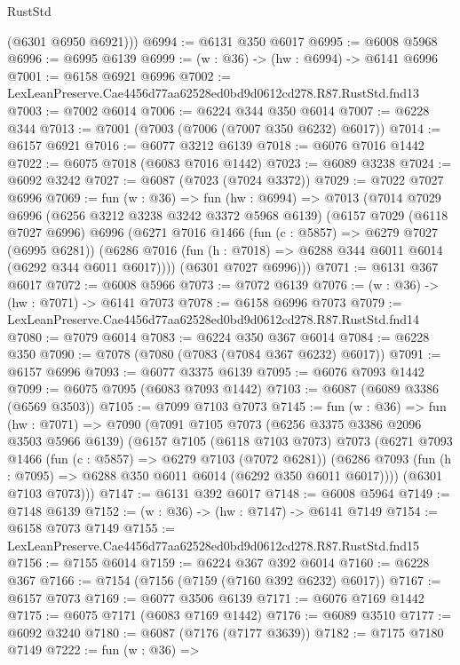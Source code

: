 \begin{lexlean}{RustStd}
\begin{coremodule}
{{        (@6301 @6950 @6921)))
@6994 := @6131 @350 @6017
@6995 := @6008 @5968
@6996 := @6995 @6139
@6999 := (w : @36) -> (hw : @6994) -> @6141 @6996
@7001 := @6158 @6921 @6996
@7002 := LexLeanPreserve.Cae4456d77aa62528ed0bd9d0612cd278.R87.RustStd.fnd13
@7003 := @7002 @6014
@7006 := @6224 @344 @350 @6014
@7007 := @6228 @344
@7013 := @7001 (@7003 (@7006 (@7007 @350 @6232) @6017))
@7014 := @6157 @6921
@7016 := @6077 @3212 @6139
@7018 := @6076 @7016 @1442
@7022 := @6075 @7018 (@6083 @7016 @1442)
@7023 := @6089 @3238
@7024 := @6092 @3242
@7027 := @6087 (@7023 (@7024 @3372))
@7029 := @7022 @7027 @6996
@7069 := fun (w : @36) =>
  fun (hw : @6994) =>
  @7013
    (@7014
      @7029
      @6996
      (@6256 @3212 @3238 @3242 @3372 @5968 @6139)
      (@6157
        @7029
        (@6118 @7027 @6996)
        @6996
        (@6271
          @7016
          @1466
          (fun (c : @5857) => @6279 @7027 (@6995 @6281))
          (@6286 @7016 (fun (h : @7018) => @6288 @344 @6011 @6014 (@6292 @344 @6011 @6017))))
        (@6301 @7027 @6996)))
@7071 := @6131 @367 @6017
@7072 := @6008 @5966
@7073 := @7072 @6139
@7076 := (w : @36) -> (hw : @7071) -> @6141 @7073
@7078 := @6158 @6996 @7073
@7079 := LexLeanPreserve.Cae4456d77aa62528ed0bd9d0612cd278.R87.RustStd.fnd14
@7080 := @7079 @6014
@7083 := @6224 @350 @367 @6014
@7084 := @6228 @350
@7090 := @7078 (@7080 (@7083 (@7084 @367 @6232) @6017))
@7091 := @6157 @6996
@7093 := @6077 @3375 @6139
@7095 := @6076 @7093 @1442
@7099 := @6075 @7095 (@6083 @7093 @1442)
@7103 := @6087 (@6089 @3386 (@6569 @3503))
@7105 := @7099 @7103 @7073
@7145 := fun (w : @36) =>
  fun (hw : @7071) =>
  @7090
    (@7091
      @7105
      @7073
      (@6256 @3375 @3386 @2096 @3503 @5966 @6139)
      (@6157
        @7105
        (@6118 @7103 @7073)
        @7073
        (@6271
          @7093
          @1466
          (fun (c : @5857) => @6279 @7103 (@7072 @6281))
          (@6286 @7093 (fun (h : @7095) => @6288 @350 @6011 @6014 (@6292 @350 @6011 @6017))))
        (@6301 @7103 @7073)))
@7147 := @6131 @392 @6017
@7148 := @6008 @5964
@7149 := @7148 @6139
@7152 := (w : @36) -> (hw : @7147) -> @6141 @7149
@7154 := @6158 @7073 @7149
@7155 := LexLeanPreserve.Cae4456d77aa62528ed0bd9d0612cd278.R87.RustStd.fnd15
@7156 := @7155 @6014
@7159 := @6224 @367 @392 @6014
@7160 := @6228 @367
@7166 := @7154 (@7156 (@7159 (@7160 @392 @6232) @6017))
@7167 := @6157 @7073
@7169 := @6077 @3506 @6139
@7171 := @6076 @7169 @1442
@7175 := @6075 @7171 (@6083 @7169 @1442)
@7176 := @6089 @3510
@7177 := @6092 @3240
@7180 := @6087 (@7176 (@7177 @3639))
@7182 := @7175 @7180 @7149
@7222 := fun (w : @36) =>
}}
\end{coremodule}
\end{lexlean}
